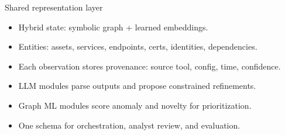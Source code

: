 \documentclass[10pt,aspectratio=169]{beamer}
\begin{document}
\begin{frame}{Shared representation layer}
    \begin{itemize}
        \item Hybrid state: symbolic graph + learned embeddings.
        \item Entities: assets, services, endpoints, certs, identities, dependencies.
        \item Each observation stores provenance: source tool, config, time, confidence.
        \item LLM modules parse outputs and propose constrained refinements.
        \item Graph ML modules score anomaly and novelty for prioritization.
        \item One schema for orchestration, analyst review, and evaluation.
    \end{itemize}
\end{frame}
\end{document}
